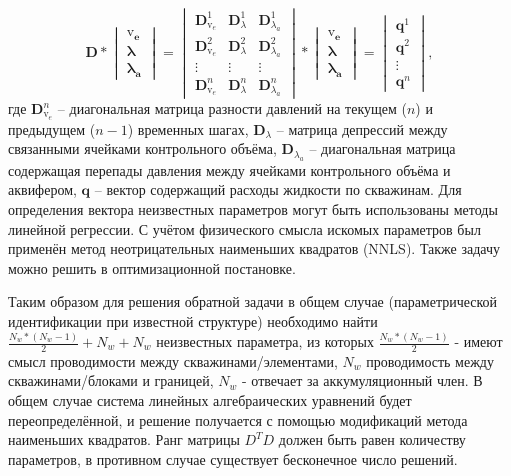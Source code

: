 \documentclass[14pt]{article}
\begin{document}
\begin{equation} \label{m3x1}
	\boldsymbol{D}
	*
	\begin{vmatrix}
		\boldsymbol{\mathrm{v}_e} \\ \boldsymbol{\lambda} \\ \boldsymbol{\lambda_a}
	\end{vmatrix}
	=
	\begin{vmatrix}
		\boldsymbol{D}_{\mathrm{v}_e}^1& \boldsymbol{D}_{\lambda}^1& \boldsymbol{D}_{\lambda_a}^1\\
		\boldsymbol{D}_{\mathrm{v}_e}^2& \boldsymbol{D}_{\lambda}^2& \boldsymbol{D}_{\lambda_a}^2 \\
		\vdots&\vdots&\vdots\\
		\boldsymbol{D}_{\mathrm{v}_e}^n& \boldsymbol{D}_{\lambda}^n& \boldsymbol{D}_{\lambda_a}^n
	\end{vmatrix}
	* 
	\begin{vmatrix}
\boldsymbol{\mathrm{v}_e} \\ \boldsymbol{\lambda} \\ \boldsymbol{\lambda_a}
	\end{vmatrix}
	=
	\begin{vmatrix}
		\boldsymbol{q}^1\\
		\boldsymbol{q}^2\\
		\vdots\\
		\boldsymbol{q}^n
	\end{vmatrix},
\end{equation}
где $\boldsymbol{D}_{\mathrm{v}_e}^n$ -- диагональная матрица  разности давлений на текущем ($n$) и предыдущем ($n-1$) временных шагах, $\boldsymbol{D}_{\lambda}$ -- матрица депрессий между связанными ячейками контрольного объёма, $\boldsymbol{D}_{\lambda_a}$ -- диагональная матрица содержащая перепады давления между ячейками контрольного объёма и аквифером, $\boldsymbol{q}$ -- вектор содержащий расходы жидкости по скважинам.
Для определения вектора неизвестных параметров могут быть использованы методы линейной регрессии. С учётом физического смысла искомых параметров был применён метод неотрицательных наименьших квадратов (NNLS). Также задачу можно решить в оптимизационной постановке.

Таким образом для решения обратной задачи в общем случае (параметрической идентификации при известной структуре) необходимо найти $\frac{N_w*(N_w-1)}{2} + N_w + N_w$ неизвестных параметра, из которых $\frac{N_w*(N_w-1)}{2}$ - имеют смысл проводимости между скважинами/элементами, $N_w$ проводимость между скважинами/блоками и границей, $N_w$ - отвечает за аккумуляционный член. 
В общем случае система линейных алгебраических уравнений будет переопределённой, и решение получается с помощью модификаций метода наименьших квадратов. Ранг матрицы $D^TD$ должен быть равен количеству параметров, в противном случае существует бесконечное число решений.
\end{document}
